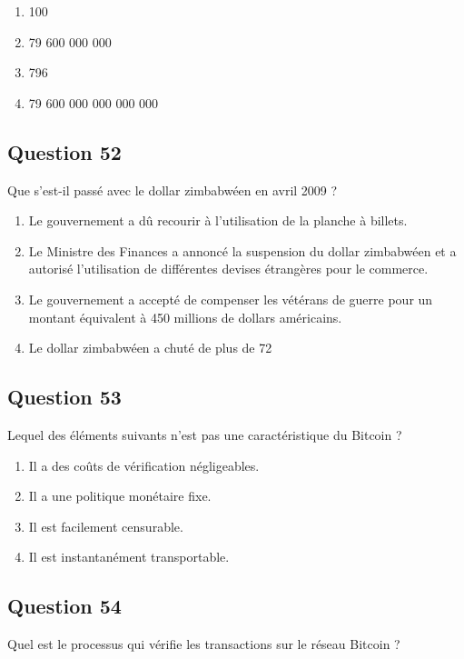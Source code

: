 \documentclass[12pt,a4paper]{article}
\begin{document}
\begin{enumerate}[label=\Alph*., leftmargin=*]
\item 100 %
\item 79 600 000 000 %
\item 796 %
\item 79 600 000 000 000 000 %
\end{enumerate}

\bigskip


\subsection*{Question 52}
Que s'est-il passé avec le dollar zimbabwéen en avril 2009 ?

\begin{enumerate}[label=\Alph*., leftmargin=*]
\item Le gouvernement a dû recourir à l'utilisation de la planche à billets.
\item Le Ministre des Finances a annoncé la suspension du dollar zimbabwéen et a autorisé l'utilisation de différentes devises étrangères pour le commerce.
\item Le gouvernement a accepté de compenser les vétérans de guerre pour un montant équivalent à 450 millions de dollars américains.
\item Le dollar zimbabwéen a chuté de plus de 72%
\end{enumerate}

\bigskip


\subsection*{Question 53}
Lequel des éléments suivants n'est pas une caractéristique du Bitcoin ?

\begin{enumerate}[label=\Alph*., leftmargin=*]
\item Il a des coûts de vérification négligeables.
\item Il a une politique monétaire fixe.
\item Il est facilement censurable.
\item Il est instantanément transportable.
\end{enumerate}

\bigskip


\subsection*{Question 54}
Quel est le processus qui vérifie les transactions sur le réseau Bitcoin ?
\end{document}
